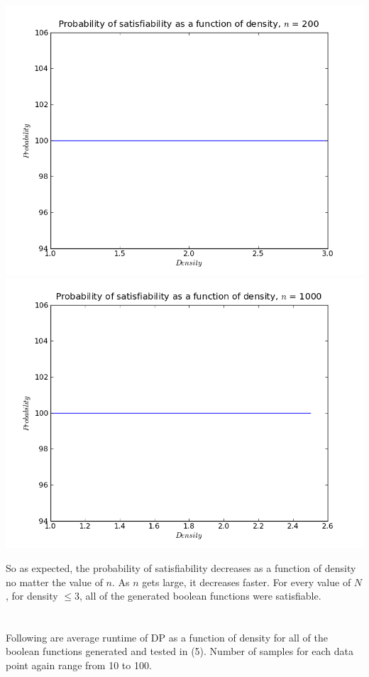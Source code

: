 \documentclass{article}
\begin{document}
\includegraphics[scale=0.5]{probn200.png}
\includegraphics[scale=0.5]{probn1000.png}

So as expected, the probability of satisfiability decreases as a function of
density no matter the value of $n$. As $n$ gets large, it decreases faster.
For every value of $N$, for density $\le 3$, all of the generated boolean
functions were satisfiable.

\section{}
Following are average runtime of DP as a function of density for all of the
boolean functions generated and tested in (5). Number of samples for each data
point again range from 10 to 100.
\end{document}
